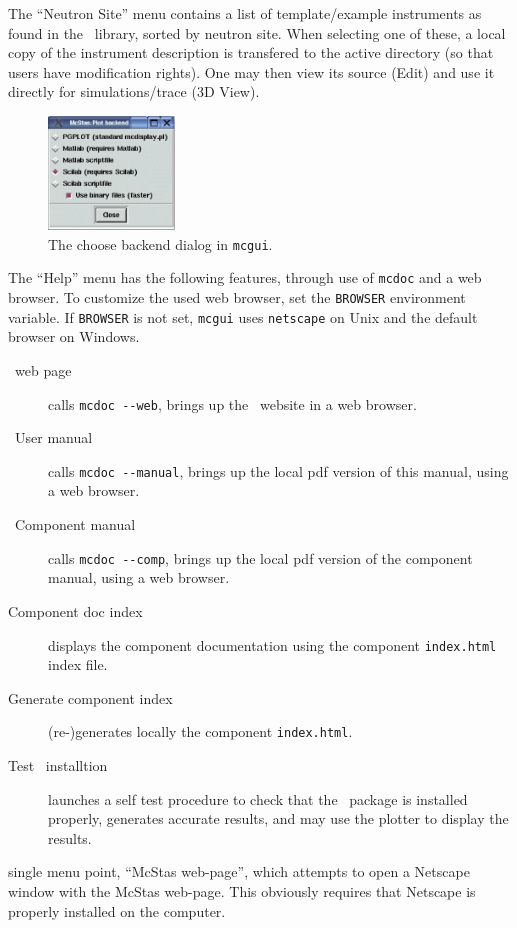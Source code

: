\noindent The ``Neutron Site'' menu contains a list of template/example instruments as found in the \MCS\ library, sorted by neutron site. When selecting one of these, a local copy of the instrument description is transfered to the active directory (so that users have modification rights). One may then view its source (Edit) and use it directly for simulations/trace (3D View).
 \begin{figure}[htb!]
  \begin{center}
    \includegraphics[width=0.3\textwidth]{figures/choose_backend.eps}
  \end{center}
\caption{The choose backend dialog in \texttt{mcgui}.}
\label{fig:mcgui-choose}
\end{figure}

The ``Help'' menu has the following features, through use of
\verb+mcdoc+ and a web browser. To customize the used web browser, set
the \verb+BROWSER+ environment variable. If \verb+BROWSER+ is not set,
\verb+mcgui+ uses \verb+netscape+ on Unix and the default browser on
Windows.
\begin{description}
\item[\MCS\ web page] calls \verb+mcdoc --web+, brings up the \MCS\
  website in a web browser.
\item[\MCS\ User manual] calls \verb+mcdoc --manual+, brings up the local
  pdf version of this manual, using a web browser.
\item[\MCS\ Component manual] calls \verb+mcdoc --comp+, brings up the local
  pdf version of the component manual, using a web browser.  
\item[Component doc index] displays the component documentation using
  the component \verb+index.html+ index file.
\item[Generate component index] (re-)generates locally the component \verb+index.html+.
\item[Test \MCS\ installtion] launches a self test procedure to check that the \MCS\ package is installed properly, generates accurate results, and may use the plotter to display the results.
\end{description}
 single menu point, ``McStas web-page'', which
attempts to open a Netscape window with the McStas web-page. This
obviously requires that Netscape is properly installed on the computer.


